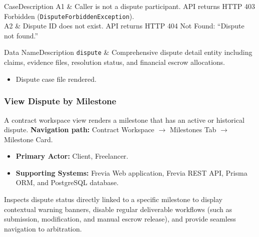 \begin{flowtable}{Case}{Description}
      A1 & Caller is not a dispute participant. API returns HTTP 403 Forbidden (\texttt{DisputeForbiddenException}).\\ \hline
      A2 & Dispute ID does not exist. API returns HTTP 404 Not Found: ``Dispute not found.''\\ \hline
\end{flowtable}

\begin{specdatatable}{Data Name}{Description}
      \texttt{dispute} & Comprehensive dispute detail entity including claims, evidence files, resolution status, and financial escrow allocations.\\ \hline
\end{specdatatable}

\begin{itemize}[leftmargin=1.6em,topsep=3pt,itemsep=2pt,parsep=0pt,label=$\bullet$]
      \item Dispute case file rendered.
\end{itemize}

\subsubsection{ View Dispute by Milestone}

A contract workspace view renders a milestone that has an active or historical dispute.\newline
\textbf{Navigation path:} Contract Workspace $\rightarrow$ Milestones Tab $\rightarrow$ Milestone Card.


\begin{itemize}[leftmargin=1.6em,topsep=3pt,itemsep=2pt,parsep=0pt,label=$\bullet$]
      \item \textbf{Primary Actor:} Client, Freelancer.
      \item \textbf{Supporting Systems:} Frevia Web application, Frevia REST API, Prisma ORM, and PostgreSQL database.
\end{itemize}

\noindent Inspects dispute status directly linked to a specific milestone to display contextual warning banners, disable regular deliverable workflows (such as submission, modification, and manual escrow release), and provide seamless navigation to arbitration.

